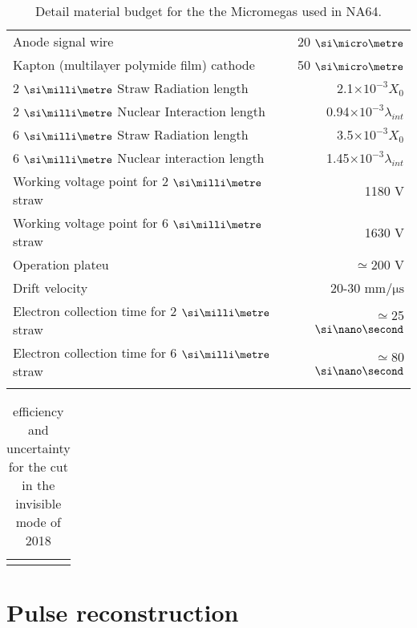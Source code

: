 \begin{longtable}{|l|r|}
  Anode signal wire & 20 $\mum$ \\
  Kapton (multilayer polymide film) cathode & 50 $\mum$ \\
  2 $\mmi$ Straw Radiation length & 2.1$\times 10^{-3}X_0$ \\
  2 $\mmi$ Nuclear Interaction length & 0.94$\times 10^{-3}\lambda_{int}$ \\
  6 $\mmi$ Straw Radiation length & 3.5$\times 10^{-3}X_0$ \\
  6 $\mmi$ Nuclear interaction length & 1.45$\times 10^{-3}\lambda_{int}$ \\
  Working voltage point for 2 $\mmi$ straw & 1180 \si{\volt} \\
  Working voltage point for 6 $\mmi$ straw & 1630 \si{\volt} \\
  Operation plateu & $\simeq$200 \si{\volt} \\
  Drift velocity & 20-30 $\si{\milli\meter\per\micro\second}$ \\
  Electron collection time for 2 $\mmi$ straw & $\simeq$25 $\nas$ \\
  Electron collection time for 6 $\mmi$ straw & $\simeq$80 $\nas$ \\
               
  
  
  \hline
  \caption[sub-detectors description]{Detail material budget for the the Micromegas used in NA64.}
  \label{tab:detector-tables}
  \end{longtable}

\begin{table}[bth!]
  \centering
  \begin{tabular}{|lrr|}
    &&
  \end{tabular}
  \caption[efficiency cuts invisible mode]{efficiency and uncertainty for the cut in the invisible mode of 2018}
  \label{tab:inv-cut-eff}
\end{table}

\section{Pulse reconstruction}
\label{sec:pulse-reconstruction}

